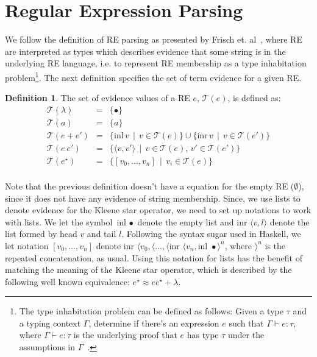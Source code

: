 \documentclass[oneside,12pt]{scrbook}
\theoremstyle{definition}
\theoremstyle{plain}
\theoremstyle{definition}
\newtheorem{Definition}{Definition}
\begin{document}
\section{Regular Expression Parsing}\label{subsection:reparsing}

We follow the definition of RE parsing as presented by Frisch et. al~\cite{Frisch2004}, where RE are interpreted
as types which describes evidence that some string is in the underlying RE language, i.e. to represent RE membership
as a type inhabitation problem\footnote{The type inhabitation problem can be defined as follows: Given a type
$\tau$ and a typing context $\Gamma$, determine if there's an expression $e$ such that $\Gamma \vdash e : \tau$, where
$\Gamma \vdash e : \tau$ is the underlying proof that $e$ has type $\tau$ under the assumptions in $\Gamma$~\cite{Hindley2008}.}.
The next definition specifies the set of term evidence for a given RE.

\begin{Definition}
  The set of evidence values of a RE $e$, $\mathcal{T}(e)$, is defined as:
  \[
      \begin{array}{lcl}
         \mathcal{T}(\lambda)   & = & \{\bullet\} \\
         \mathcal{T}(a)         & = & \{a\} \\
         \mathcal{T}(e + e')    & = & \{\text{inl}\,v\,\mid\, v \in \mathcal{T}(e)\} \cup
                                      \{\text{inr}\,v\,\mid\, v \in \mathcal{T}(e')\} \\
         \mathcal{T}(e\:e')     & = & \{\langle v, v' \rangle \,\mid \, v \in \mathcal{T}(e),\, v' \in \mathcal{T}(e')\} \\
         \mathcal{T}(e^\star)   & = & \{[v_0,...,v_n]\,\mid\,v_i \in \mathcal{T}(e)\} \\
      \end{array}
  \]
\end{Definition}

Note that the previous definition doesn't have a equation for the empty RE ($\emptyset$), since it does not
have any evidence of string membership. Since, we use lists to denote evidence for the Kleene star operator,
we need to set up notations to work with lists. We let the symbol $\text{inl }\bullet$ denote the empty list and 
$\text{inr }\langle v, l \rangle$ denote the list formed by head $v$ and tail $l$. Following the syntax sugar used in
Haskell, we let notation $[v_0,...,v_n]$ denote $\text{inr }\langle v_0,\langle...,\langle \text{inr }\langle v_n, \text{inl } \bullet\rangle^n$,
where $\rangle^n$ is the repeated concatenation, as usual. Using this notation for lists has the benefit of matching
the meaning of the Kleene star operator, which is described by the following well known equivalence:
$e^\star \approx e e^\star + \lambda$.
\end{document}
